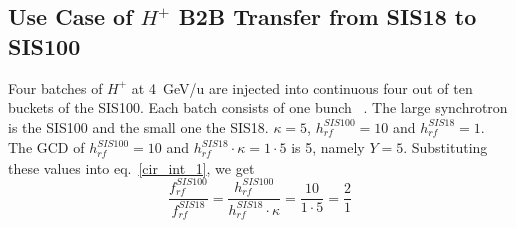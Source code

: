 %
%
%
\subsection{Use Case of $H^{+}$ B2B Transfer from SIS18 to SIS100}
\label{sec:cir_no_int1}
Four batches of $H^{+}$ at \SI{4}{GeV/\atomicmassunit} are injected into continuous four out of ten buckets of the SIS100. Each batch consists of one bunch ~\cite{liebermann_fair_2013, liebermann_sis100_2013}. The large synchrotron is the SIS100 and the small one the SIS18. $\kappa=5$, $h^{\mathit{SIS100}}_\mathit{rf}=10$ and $h^{\mathit{SIS18}}_\mathit{rf}=1$. The GCD of $h^{\mathit{SIS100}}_\mathit{rf}=10$ and $h^{\mathit{SIS18}}_\mathit{rf} \cdot \kappa=1\cdot 5$ is 5, namely $Y=5$. Substituting these values into eq.~\ref{cir_int_1}, we get
\begin{equation}
\frac{f_{\mathit{rf}}^{\mathit{SIS100}}}{f_{\mathit{rf}}^{\mathit{SIS18}}}= \frac {h^{\mathit{SIS100}}_\mathit{rf}}{h^{\mathit{SIS18}}_\mathit{rf} \cdot \kappa}= \frac{10}{1 \cdot 5}=\frac{2}{1}
\end{equation}

